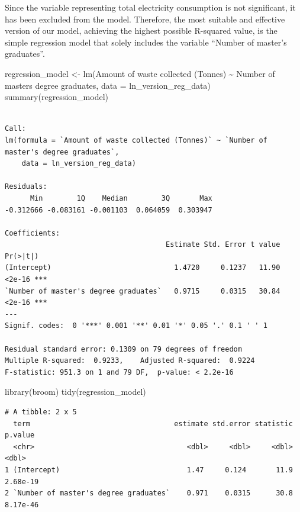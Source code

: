 \documentclass[
  11pt,
  a4paper,
  DIV=11,
  numbers=noendperiod]{scrartcl}
\newenvironment{Shaded}{\begin{snugshade}}{\end{snugshade}}
\newcommand{\AttributeTok}[1]{\textcolor[rgb]{0.40,0.45,0.13}{#1}}
\newcommand{\FunctionTok}[1]{\textcolor[rgb]{0.28,0.35,0.67}{#1}}
\newcommand{\NormalTok}[1]{\textcolor[rgb]{0.00,0.23,0.31}{#1}}
\newcommand{\OtherTok}[1]{\textcolor[rgb]{0.00,0.23,0.31}{#1}}
\newcommand{\SpecialCharTok}[1]{\textcolor[rgb]{0.37,0.37,0.37}{#1}}
\newcommand{\StringTok}[1]{\textcolor[rgb]{0.13,0.47,0.30}{#1}}
\begin{document}
{Since the variable representing total electricity consumption is not
significant, it has been excluded from the model.} Therefore, the most
suitable and effective version of our model, achieving the highest
possible R-squared value, is the simple regression model that solely
includes the variable ``Number of master's graduates''.

\begin{Shaded}
\begin{Highlighting}[]
\NormalTok{regression\_model }\OtherTok{\textless{}{-}} \FunctionTok{lm}\NormalTok{(}\StringTok{\textasciigrave{}}\AttributeTok{Amount of waste collected (Tonnes)}\StringTok{\textasciigrave{}} \SpecialCharTok{\textasciitilde{}} \StringTok{\textasciigrave{}}\AttributeTok{Number of master\textquotesingle{}s degree graduates}\StringTok{\textasciigrave{}}\NormalTok{, }\AttributeTok{data =}\NormalTok{ ln\_version\_reg\_data) }
\FunctionTok{summary}\NormalTok{(regression\_model)}
\end{Highlighting}
\end{Shaded}

\begin{verbatim}

Call:
lm(formula = `Amount of waste collected (Tonnes)` ~ `Number of master's degree graduates`, 
    data = ln_version_reg_data)

Residuals:
      Min        1Q    Median        3Q       Max 
-0.312666 -0.083161 -0.001103  0.064059  0.303947 

Coefficients:
                                      Estimate Std. Error t value Pr(>|t|)    
(Intercept)                             1.4720     0.1237   11.90   <2e-16 ***
`Number of master's degree graduates`   0.9715     0.0315   30.84   <2e-16 ***
---
Signif. codes:  0 '***' 0.001 '**' 0.01 '*' 0.05 '.' 0.1 ' ' 1

Residual standard error: 0.1309 on 79 degrees of freedom
Multiple R-squared:  0.9233,    Adjusted R-squared:  0.9224 
F-statistic: 951.3 on 1 and 79 DF,  p-value: < 2.2e-16
\end{verbatim}

\begin{Shaded}
\begin{Highlighting}[]
\FunctionTok{library}\NormalTok{(broom)}
\FunctionTok{tidy}\NormalTok{(regression\_model)}
\end{Highlighting}
\end{Shaded}

\begin{verbatim}
# A tibble: 2 x 5
  term                                  estimate std.error statistic  p.value
  <chr>                                    <dbl>     <dbl>     <dbl>    <dbl>
1 (Intercept)                              1.47     0.124       11.9 2.68e-19
2 `Number of master's degree graduates`    0.971    0.0315      30.8 8.17e-46
\end{verbatim}
\end{document}

